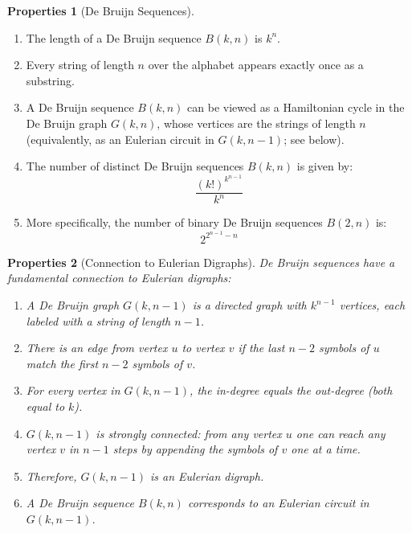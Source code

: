 \documentclass{article}
\newtheorem{properties}{Properties}
\theoremstyle{definition}
\begin{document}
\begin{properties}[De Bruijn Sequences]
\end{properties}
\vspace{0.5em} %

\begin{enumerate}
    \item The length of a De Bruijn sequence $B(k, n)$ is $k^n$.
    
    \item Every string of length $n$ over the alphabet appears exactly once as a substring.
    
    \item A De Bruijn sequence $B(k, n)$ can be viewed as a Hamiltonian cycle in the De Bruijn graph $G(k, n)$, whose vertices are the strings of length $n$ (equivalently, as an Eulerian circuit in $G(k, n-1)$; see below).
    
    \item The number of distinct De Bruijn sequences $B(k, n)$ is given by:
    \begin{equation}
        \frac{(k!)^{k^{n-1}}}{k^n}
    \end{equation}
    
    \item More specifically, the number of binary De Bruijn sequences $B(2, n)$ is:
    \begin{equation}
        2^{2^{n-1}-n}
    \end{equation}
\end{enumerate}

\begin{properties}[Connection to Eulerian Digraphs]
De Bruijn sequences have a fundamental connection to Eulerian digraphs:
\begin{enumerate}
    \item A De Bruijn graph $G(k, n-1)$ is a directed graph with $k^{n-1}$ vertices, each labeled with a string of length $n-1$.
    \item There is an edge from vertex $u$ to vertex $v$ if the last $n-2$ symbols of $u$ match the first $n-2$ symbols of $v$.
    \item For every vertex in $G(k, n-1)$, the in-degree equals the out-degree (both equal to $k$).
    \item $G(k, n-1)$ is strongly connected: from any vertex $u$ one can reach any vertex $v$ in $n-1$ steps by appending the symbols of $v$ one at a time.
    \item Therefore, $G(k, n-1)$ is an Eulerian digraph.
    \item A De Bruijn sequence $B(k, n)$ corresponds to an Eulerian circuit in $G(k, n-1)$.
\end{enumerate}
\end{properties}
\end{document}
